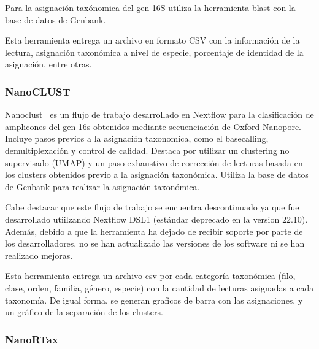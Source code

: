 Para la asignación taxónomica del gen 16S utiliza la herramienta blast con la base de datos de Genbank.

Esta herramienta entrega un archivo en formato CSV con la información de la lectura, asignación taxonómica a nivel de especie, porcentaje de identidad de la asignación, entre otras.
\subsubsection{NanoCLUST}
Nanoclust~\cite{10.1093/bioinformatics/btaa900} es un flujo de trabajo desarrollado en Nextflow para la clasificación de amplicones del gen 16s obtenidos mediante secuenciación de Oxford Nanopore. Incluye pasos previos a la asignación taxonomica, como el basecalling, demultiplexación y control de calidad. Destaca por utilizar un clustering no supervisado (UMAP) y un paso exhaustivo de corrección de lecturas basada en los clusters obtenidos previo a la asignación taxonómica.
Utiliza la base de datos de Genbank para realizar la asignación taxonómica.

Cabe destacar que este flujo de trabajo se encuentra descontinuado ya que fue desarrollado utiilzando Nextflow DSL1 (estándar deprecado en la version 22.10). Además, debido a que la herramienta ha dejado de recibir soporte por parte de los desarrolladores, no se han actualizado las versiones de los software ni se han realizado mejoras.

Esta herramienta entrega un archivo csv por cada categoría taxonómica (filo, clase, orden, familia, género, especie) con la cantidad de lecturas asignadas a cada taxonomía. De igual forma, se generan graficos de barra con las asignaciones, y un gráfico de la separación de los clusters. 
\subsubsection{NanoRTax}


